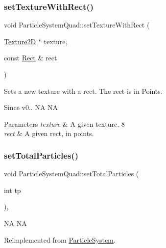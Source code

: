 \subsubsection{\texorpdfstring{set\+Texture\+With\+Rect()}{setTextureWithRect()}\hspace{0.1cm}{\footnotesize\ttfamily [2/2]}}
{\footnotesize\ttfamily void Particle\+System\+Quad\+::set\+Texture\+With\+Rect (\begin{DoxyParamCaption}\item[{\hyperlink{classTexture2D}{Texture2D} $\ast$}]{texture,  }\item[{const \hyperlink{classRect}{Rect} \&}]{rect }\end{DoxyParamCaption})}

Sets a new texture with a rect. The rect is in Points. \begin{DoxySince}{Since}
v0..  NA  NA
\end{DoxySince}

\begin{DoxyParams}{Parameters}
{\em texture} & A given texture. 8 \\
\hline
{\em rect} & A given rect, in points. \\
\hline
\end{DoxyParams}
\mbox{\label{classParticleSystemQuad_a11be26d03c7ddefb91f16a93fb849439}} 
\subsubsection{\texorpdfstring{set\+Total\+Particles()}{setTotalParticles()}\hspace{0.1cm}{\footnotesize\ttfamily [1/2]}}
{\footnotesize\ttfamily void Particle\+System\+Quad\+::set\+Total\+Particles (\begin{DoxyParamCaption}\item[{int}]{tp }\end{DoxyParamCaption})\hspace{0.3cm}{\ttfamily [override]}, {\ttfamily [virtual]}}

NA  NA 

Reimplemented from \hyperlink{classParticleSystem_ad406c6892022b3ec0173f1c940055ed3}{Particle\+System}.

\mbox{\label{classParticleSystemQuad_a8798b3c44a7db32d7ab5b76e245edd27}} 
